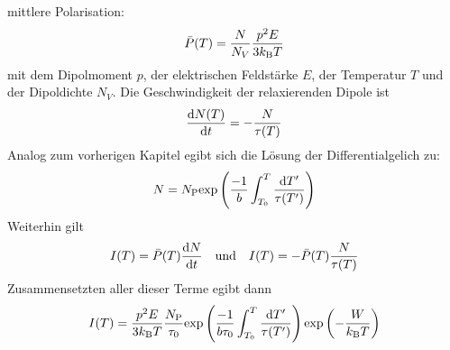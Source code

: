 		mittlere Polarisation:
		\begin{equation}
			\bar{P}(T) = \frac{N}{N_V}\frac{p^2E}{3k_{\text{B}}T}
		\end{equation}	
		mit dem Dipolmoment $p$, der elektrischen Feldstärke $E$, der Temperatur $T$ und der Dipoldichte $N_V$.
		Die Geschwindigkeit der relaxierenden Dipole ist
		\begin{equation}
			\frac{\text{d} N(T)}{\text{d} t} =- \frac{N}{\tau(T)}
		\end{equation}
		Analog zum vorherigen Kapitel egibt sich die Lösung der Differentialgelich zu:
		\begin{equation}
			N = N_{\text{P}} \text{exp}\left( \frac{-1}{b}\int_{T_0}^T \frac{\text{d}T'}{\tau(T')}\right)
		\end{equation}
		Weiterhin gilt
		\begin{align}
			I(T) = \bar{P}(T)\frac{\text{d} N}{\text{d} t}& &\text{und} & & I(T) = -\bar{P}(T) \frac{N}{\tau(T)}
		\end{align}
		Zusammensetzten aller dieser Terme egibt dann
		\begin{equation}
			I(T) =\frac{p^2E}{3k_{\text{B}}T}\frac{N_{\text{P}}}{\tau_0}\text{exp}\left(\frac{-1}{b\tau_0}\int_{T_0}^T\frac{\text{d}T'}{\tau(T')}\right)\text{exp}\left(-\frac{W}{k_{\text{B}}T}\right)
		\end{equation}		
			
